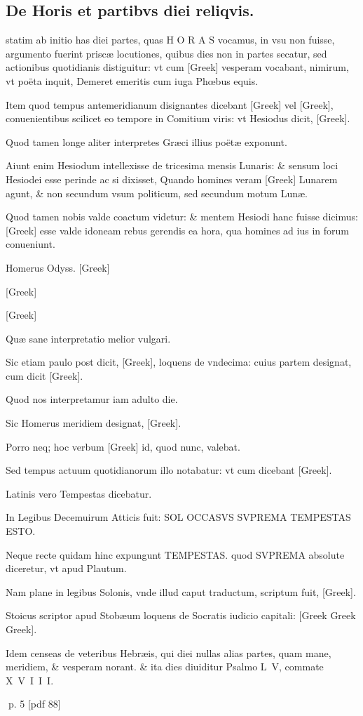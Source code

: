 \subsection[De Horis \& partibus diei reliquis.]{De Horis et partibvs diei reliqvis.}
\setcounter{parcount}{0}
\begin{parnumbers}

 statim ab initio has diei partes, quas H O R A S vocamus, in vsu non fuisse, argumento fuerint priscæ locutiones,  quibus dies non in partes secatur, sed actionibus quotidianis distiguitur: vt cum \textgreek{[Greek]} vesperam vocabant, nimirum, vt poëta inquit, Demeret emeritis cum iuga Phœbus equis.

Item quod tempus antemeridianum disignantes dicebant \textgreek{[Greek]} vel \textgreek{[Greek]}, conuenientibus scilicet eo tempore in Comitium viris: vt Hesiodus dicit, \textgreek{[Greek]}.

Quod tamen longe aliter interpretes Græci illius poëtæ exponunt.

Aiunt enim Hesiodum intellexisse de tricesima mensis Lunaris: \& sensum loci Hesiodei esse perinde ac si dixisset, Quando homines veram \textgreek{[Greek]} Lunarem agunt, \& non secundum vsum politicum, sed secundum motum Lunæ.

Quod  tamen nobis valde coactum videtur: \& mentem Hesiodi hanc fuisse dicimus: \textgreek{[Greek]} esse valde idoneam rebus gerendis ea hora, qua homines ad ius in forum conueniunt.

Homerus Odyss. \textgreek{[Greek]}

\textgreek{[Greek]}

\textgreek{[Greek]}

Quæ sane interpretatio melior vulgari.

Sic etiam paulo post dicit, \textgreek{[Greek]}, loquens de vndecima: cuius partem designat, cum dicit \textgreek{[Greek]}.

Quod nos interpretamur iam adulto die.

Sic Homerus meridiem designat, \textgreek{[Greek]}.

Porro neq; hoc verbum \textgreek{[Greek]} id, quod nunc, valebat.

Sed tempus actuum quotidianorum illo notabatur: vt cum dicebant \textgreek{[Greek]}.

 Latinis vero Tempestas dicebatur.

In Legibus Decemuirum Atticis fuit: SOL OCCASVS SVPREMA TEMPESTAS ESTO.

Neque recte quidam hinc expungunt TEMPESTAS. quod SVPREMA absolute diceretur, vt apud Plautum.

Nam plane in legibus Solonis, vnde illud caput traductum, scriptum fuit, \textgreek{[Greek]}.

Stoicus scriptor apud Stobæum loquens de Socratis iudicio capitali: [Greek Greek Greek].

Idem censeas de veteribus Hebræis,  qui diei nullas alias partes, quam mane, meridiem, \& vesperam norant. \& ita dies diuiditur Psalmo L V, commate X V I I I.

\end{parnumbers}
\clearpage
p. 5 [pdf 88]

